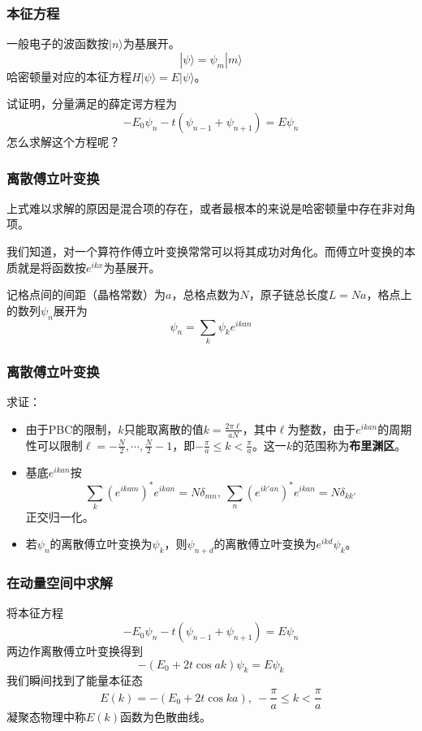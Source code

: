 \documentclass[CJK]{beamer}
\begin{document}
\begin{frame}
\frametitle{\bch 本征方程 \ech}
\bch
一般电子的波函数按$|n\rangle$为基展开。
$$
| \psi \rangle = \psi_m |m \rangle
$$
哈密顿量对应的本征方程$H |\psi \rangle = E | \psi \rangle$。
\par
试证明，分量满足的薛定谔方程为
$$
-E_0 \psi_n - t (\psi_{n-1} + \psi_{n+1} ) = E\psi_n
$$
怎么求解这个方程呢？
\ech
\end{frame}


\begin{frame}
\frametitle{\bch 离散傅立叶变换 \ech}
\bch
上式难以求解的原因是混合项的存在，或者最根本的来说是哈密顿量中存在非对角项。
\par
我们知道，对一个算符作傅立叶变换常常可以将其成功对角化。而傅立叶变换的本质就是将函数按$e^{ikx}$为基展开。
\par
记格点间的间距（晶格常数）为$a$，总格点数为$N$，原子链总长度$L = Na$，格点上的数列$\psi_n$展开为
$$
\psi_n = \sum_k \psi_k e^{ikan}
$$

\ech
\end{frame}

\begin{frame}
\frametitle{\bch 离散傅立叶变换 \ech}
\bch
求证：
\begin{itemize}
\item 由于PBC的限制，$k$只能取离散的值$k = \frac{2\pi \ell}{aN}$，其中$\ell$为整数，由于$e^{ikan}$的周期性可以限制$\ell = -\frac{N}{2}, \cdots ,\frac{N}{2}-1$，即$-\frac{\pi}{a} \leq k < \frac{\pi}{a}$。这一$k$的范围称为{\bf 布里渊区}。
\item 基底$e^{ikan}$按$$\sum_k (e^{ikam})^* e^{ikan} = N \delta_{mn},\ \sum_n (e^{ik'a n})^* e^{ikan} = N \delta_{kk'}$$正交归一化。
\item 若$\psi_n$的离散傅立叶变换为$\psi_k$，则$\psi_{n+d}$的离散傅立叶变换为$e^{ikd} \psi_k$。
\end{itemize}

\ech
\end{frame}

\begin{frame}
\frametitle{\bch 在动量空间中求解 \ech}
\bch
将本征方程
$$
-E_0 \psi_n - t (\psi_{n-1} + \psi_{n+1} ) = E\psi_n
$$
两边作离散傅立叶变换得到
$$
-(E_0 +2t\cos ak)\psi_k = E \psi_k
$$
我们瞬间找到了能量本征态
$$
E(k) = -(E_0 + 2t \cos ka), \ -\frac{\pi}{a} \leq k < \frac{\pi}{a}
$$
凝聚态物理中称$E(k)$函数为色散曲线。
\ech
\end{frame}
\end{document}
